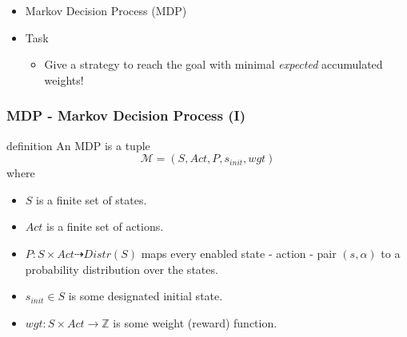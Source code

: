 \documentclass[onlymath]{beamer}
\begin{document}
\begin{frame}
\begin{itemize}
\begin{center}
	\end{center}
	\pause
	\item Markov Decision Process (MDP)
	\pause
	\item Task
	\begin{itemize}
		\item Give a strategy to reach the goal with minimal \textit{expected} accumulated weights!
	\end{itemize}
\end{itemize}
\end{frame}

\begin{frame}
	\frametitle{MDP - Markov Decision Process (I)}
	\begin{block}{definition}
		An MDP is a tuple
		\[ \mathcal{M} = (S, Act, P, s_{init}, wgt)
		\] \pause
		where
		\begin{itemize}
			\item $S$ is a finite set of states. \pause
			\item $Act$ is a finite set of actions. \pause
			\item $P: S \times Act \dashrightarrow Distr(S)$ maps every enabled state - action - pair $(s,\alpha)$ to a probability distribution over the states. \pause
			\item $s_{init} \in S$ is some designated initial state. \pause
			\item $wgt : S \times Act \to \mathbb{Z}$ is some weight (reward) function.
		\end{itemize}
	\end{block}
\end{frame}
\end{document}
